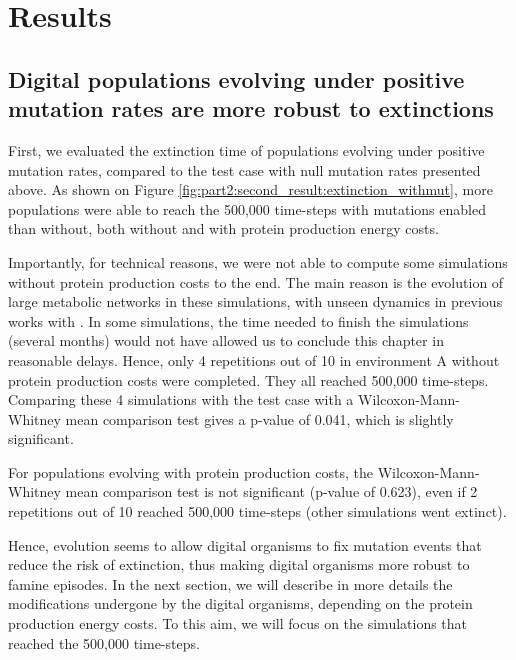 
\section{Results}
\label{sec:part2:second_result:results}


\subsection{Digital populations evolving under positive mutation rates are more robust to extinctions}
\label{subsec:part2:second_result:robust_extinction}

First, we evaluated the extinction time of populations evolving under positive mutation rates, compared to the test case with null mutation rates presented above. As shown on Figure \ref{fig:part2:second_result:extinction_withmut}, more populations were able to reach the 500,000 time-steps with mutations enabled than without, both without and with protein production energy costs.

Importantly, for technical reasons, we were not able to compute some simulations without protein production costs to the end. The main reason is the evolution of large metabolic networks in these simulations, with unseen dynamics in previous works with {\EvoEvoSim}. In some simulations, the time needed to finish the simulations (several months) would not have allowed us to conclude this chapter in reasonable delays. Hence, only 4 repetitions out of 10 in environment A without protein production costs were completed. They all reached 500,000 time-steps. Comparing these 4 simulations with the test case with a Wilcoxon-Mann-Whitney mean comparison test gives a p-value of 0.041, which is slightly significant.

For populations evolving with protein production costs, the Wilcoxon-Mann-Whitney mean comparison test is not significant (p-value of 0.623), even if 2 repetitions out of 10 reached 500,000 time-steps (other simulations went extinct).

Hence, evolution seems to allow digital organisms to fix mutation events that reduce the risk of extinction, thus making digital organisms more robust to famine episodes. In the next section, we will describe in more details the modifications undergone by the digital organisms, depending on the protein production energy costs. To this aim, we will focus on the simulations that reached the 500,000 time-steps.


